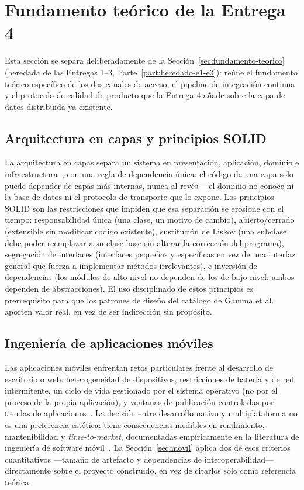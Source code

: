 \section{Fundamento teórico de la Entrega 4}
\label{sec:fundamento-teorico-e4}

Esta sección se separa deliberadamente de la Sección~\ref{sec:fundamento-teorico} (heredada de
las Entregas 1--3, Parte~\ref{part:heredado-e1-e3}): reúne el fundamento teórico específico de
los dos canales de acceso, el pipeline de integración continua y el protocolo de calidad de
producto que la Entrega 4 añade sobre la capa de datos distribuida ya existente.

\subsection{Arquitectura en capas y principios SOLID}

La arquitectura en capas separa un sistema en presentación, aplicación, dominio e
infraestructura~\cite{martin2017clean,evans2003ddd}, con una regla de dependencia única: el
código de una capa solo puede depender de capas más internas, nunca al revés —el dominio no
conoce ni la base de datos ni el protocolo de transporte que lo expone. Los principios SOLID son
las restricciones que impiden que esa separación se erosione con el tiempo: responsabilidad
única (una clase, un motivo de cambio), abierto/cerrado (extensible sin modificar código
existente), sustitución de Liskov (una subclase debe poder reemplazar a su clase base sin alterar
la corrección del programa), segregación de interfaces (interfaces pequeñas y específicas en vez
de una interfaz general que fuerza a implementar métodos irrelevantes), e inversión de
dependencias (los módulos de alto nivel no dependen de los de bajo nivel; ambos dependen de
abstracciones). El uso disciplinado de estos principios es prerrequisito para que los patrones de
diseño del catálogo de Gamma et al.~\cite{gamma1994patterns} aporten valor real, en vez de ser
indirección sin propósito.

\subsection{Ingeniería de aplicaciones móviles}

Las aplicaciones móviles enfrentan retos particulares frente al desarrollo de escritorio o web:
heterogeneidad de dispositivos, restricciones de batería y de red intermitente, un ciclo de vida
gestionado por el sistema operativo (no por el proceso de la propia aplicación), y ventanas de
publicación controladas por tiendas de aplicaciones~\cite{wasserman2010mobile}. La decisión entre
desarrollo nativo y multiplataforma no es una preferencia estética: tiene consecuencias medibles
en rendimiento, mantenibilidad y \emph{time-to-market}, documentadas empíricamente en la
literatura de ingeniería de software móvil~\cite{elkassas2017taxonomy,biornhansen2019crossplatform}.
La Sección~\ref{sec:movil} aplica dos de esos criterios cuantitativos —tamaño de artefacto y
dependencias de interoperabilidad— directamente sobre el proyecto construido, en vez de citarlos
solo como referencia teórica.

